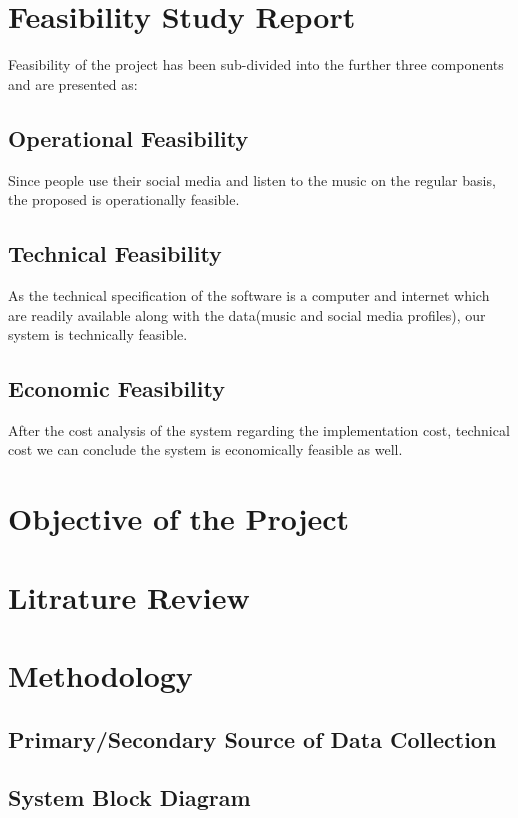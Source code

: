 \documentclass{article}
\begin{document}
\section{Feasibility Study Report}
	Feasibility of the project has been sub-divided into the further three components and are presented as:\\
	\subsection{Operational Feasibility}
	Since people use their social media and listen to the music on the regular basis, the proposed is operationally feasible.
	\subsection{Technical Feasibility}
	As the technical specification of the software is a computer and internet which are readily available along with the data(music and social media profiles), our system is technically feasible.
	\subsection{Economic Feasibility}
	After the cost analysis of the system regarding the implementation cost, technical cost we can conclude the system is economically feasible as well.
\cleardoublepage

\section{Objective of the Project}
\cleardoublepage

\section{Litrature Review}
\cleardoublepage

\section{Methodology}
\cleardoublepage

\subsection{Primary/Secondary Source of Data Collection}
\cleardoublepage

\subsection{System Block Diagram}
\cleardoublepage
\end{document}
